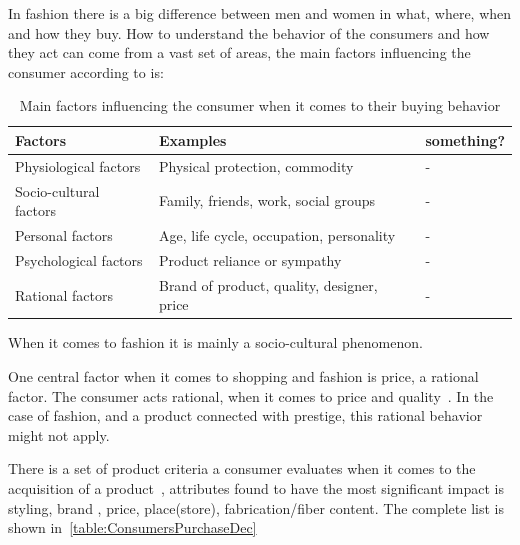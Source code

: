 
In fashion there is a big difference between men and women in what, where, when
and how they buy.  How to understand the behavior of the consumers and how they
act can come from a vast set of areas, the main factors influencing the consumer according to \cite{kotler2009marketing} is:

\begin{table}[H]
    \centering
    \begin{tabular}{l|l|l}
      \textbf{Factors}        & \textbf{Examples} & \textbf{something?} \\ \hline
      Physiological factors   & Physical protection, commodity & - \\ \hline
      Socio-cultural factors  & Family, friends, work, social groups & - \\ \hline
      Personal factors        & Age, life cycle, occupation, personality & - \\ \hline
      Psychological factors   & Product reliance or sympathy & - \\ \hline %
      Rational factors        & Brand of product, quality, designer, price & - \\
    \end{tabular}
    \label{table:FashionFactors}
    \caption [Fashion Factors]{Main factors influencing the consumer when it comes to their buying behavior}
\end{table}
When it comes to fashion it is mainly a socio-cultural phenomenon.

One central factor when it comes to shopping and fashion is price, a rational factor.
The consumer acts rational, when it comes to price and quality~\cite{Hanf1994}.
In the case of fashion, and a product connected with prestige, this rational behavior might not apply.

There is a set of product criteria a consumer evaluates when it comes to the acquisition of a product~\cite{dutton2006}, attributes found to have the most significant impact is styling, brand , price, place(store), fabrication/fiber content.
The complete list is shown in~\ref{table:ConsumersPurchaseDec}

